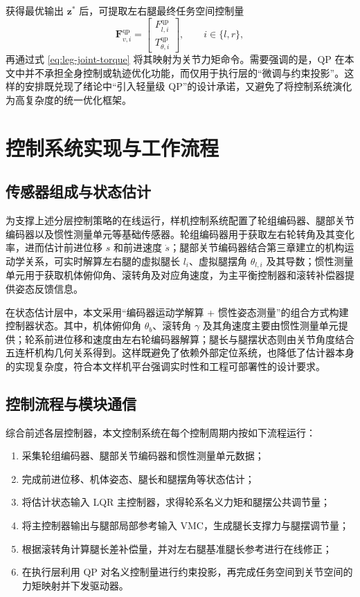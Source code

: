 获得最优输出 $\boldsymbol{z}^{\ast}$ 后，可提取左右腿最终任务空间控制量
\begin{equation}
  \boldsymbol{F}_{v,i}^{\mathrm{qp}}
  =
  \begin{bmatrix}
    F_{l,i}^{\mathrm{qp}} \\
    T_{\theta,i}^{\mathrm{qp}}
  \end{bmatrix},
  \qquad i \in \{l,r\},
  \label{eq:qp-task-space}
\end{equation}
再通过式 \eqref{eq:leg-joint-torque} 将其映射为关节力矩命令。需要强调的是，QP 在本文中并不承担全身控制或轨迹优化功能，而仅用于执行层的“微调与约束投影”。这样的安排既兑现了绪论中“引入轻量级 QP”的设计承诺，又避免了将控制系统演化为高复杂度的统一优化框架。

\section{控制系统实现与工作流程}

\subsection{传感器组成与状态估计}

为支撑上述分层控制策略的在线运行，样机控制系统配置了轮组编码器、腿部关节编码器以及惯性测量单元等基础传感器。轮组编码器用于获取左右轮转角及其变化率，进而估计前进位移 $s$ 和前进速度 $\dot{s}$；腿部关节编码器结合第三章建立的机构运动学关系，可实时解算左右腿的虚拟腿长 $l_i$、虚拟腿摆角 $\theta_{l,i}$ 及其导数；惯性测量单元用于获取机体俯仰角、滚转角及对应角速度，为主平衡控制器和滚转补偿器提供姿态反馈信息。

在状态估计层中，本文采用“编码器运动学解算 + 惯性姿态测量”的组合方式构建控制器状态。其中，机体俯仰角 $\theta_b$、滚转角 $\gamma$ 及其角速度主要由惯性测量单元提供；轮系前进位移和速度由左右轮编码器解算；腿长与腿摆状态则由关节角度结合五连杆机构几何关系得到。这样既避免了依赖外部定位系统，也降低了估计器本身的实现复杂度，符合本文样机平台强调实时性和工程可部署性的设计要求。

\subsection{控制流程与模块通信}

综合前述各层控制器，本文控制系统在每个控制周期内按如下流程运行：
\begin{enumerate}
  \item 采集轮组编码器、腿部关节编码器和惯性测量单元数据；
  \item 完成前进位移、机体姿态、腿长和腿摆角等状态估计；
  \item 将估计状态输入 LQR 主控制器，求得轮系名义力矩和腿摆公共调节量；
  \item 将主控制器输出与腿部局部参考输入 VMC，生成腿长支撑力与腿摆调节量；
  \item 根据滚转角计算腿长差补偿量，并对左右腿基准腿长参考进行在线修正；
  \item 在执行层利用 QP 对名义控制量进行约束投影，再完成任务空间到关节空间的力矩映射并下发驱动器。
\end{enumerate}

